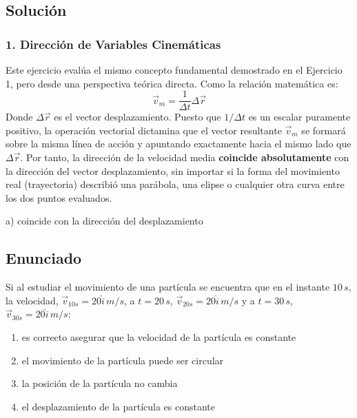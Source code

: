 \documentclass[12pt, a4paper]{article}
\begin{document}
\subsection*{Solución}

\subsubsection*{1. Dirección de Variables Cinemáticas}
Este ejercicio evalúa el mismo concepto fundamental demostrado en el Ejercicio 1, pero desde una perspectiva teórica directa.
Como la relación matemática es:
$$ \vec{v}_m = \frac{1}{\Delta t} \Delta \vec{r} $$
Donde $\Delta \vec{r}$ es el vector desplazamiento. 
Puesto que $1/\Delta t$ es un escalar puramente positivo, la operación vectorial dictamina que el vector resultante $\vec{v}_m$ se formará sobre la misma línea de acción y apuntando exactamente hacia el mismo lado que $\Delta \vec{r}$.
Por tanto, la dirección de la velocidad media \textbf{coincide absolutamente} con la dirección del vector desplazamiento, sin importar si la forma del movimiento real (trayectoria) describió una parábola, una elipse o cualquier otra curva entre los dos puntos evaluados.

\begin{tcolorbox}[colback=green!5!white, colframe=green!50!black, title=Respuesta Final]
\centering \Large a) coincide con la dirección del desplazamiento
\end{tcolorbox}

\newpage


\subsection*{Enunciado}
Si al estudiar el movimiento de una partícula se encuentra que en el instante $10\,\si{s}$, la velocidad, $\vec{v}_{10s} = 20 \hat{i} \,\si{m/s}$, a $t = 20\,\si{s}$, $\vec{v}_{20s} = 20 \hat{i} \,\si{m/s}$ y a $t = 30\,\si{s}$, $\vec{v}_{30s} = 20 \hat{i} \,\si{m/s}$:
\begin{enumerate}[label=\alph*)]
    \item es correcto asegurar que la velocidad de la partícula es constante
    \item el movimiento de la partícula puede ser circular
    \item la posición de la partícula no cambia
    \item el desplazamiento de la partícula es constante
\end{enumerate}
\end{document}
